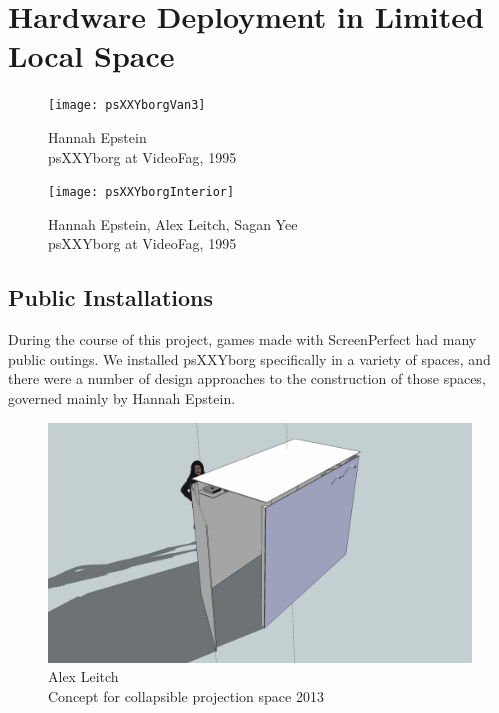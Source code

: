 
\chapter{Hardware Deployment in Limited Local Space}\thispagestyle{empty} %

\label{Chapter4} 

\begin{figure}[!ht]
 \centering
  \texttt{[image: psXXYborgVan3]}
  \caption{Hannah Epstein\\ psXXYborg at VideoFag, 1995}
\end{figure}

\begin{figure}[!ht]
 \centering
  \texttt{[image: psXXYborgInterior]}
  \caption{Hannah Epstein, Alex Leitch, Sagan Yee\\ psXXYborg at VideoFag, 1995}
\end{figure}
\newpage
\newpage

\section{Public Installations}
During the course of this project, games made with ScreenPerfect had many public outings. We installed psXXYborg specifically in a variety of spaces, and there were a number of design approaches to the construction of those spaces, governed mainly by Hannah Epstein.

\newpage

\begin{figure}[!ht]
 \centering
  \includegraphics[width=\textwidth]{psXXYborgBox}
  \caption{Alex Leitch\\Concept for collapsible projection space 2013}
\end{figure}

